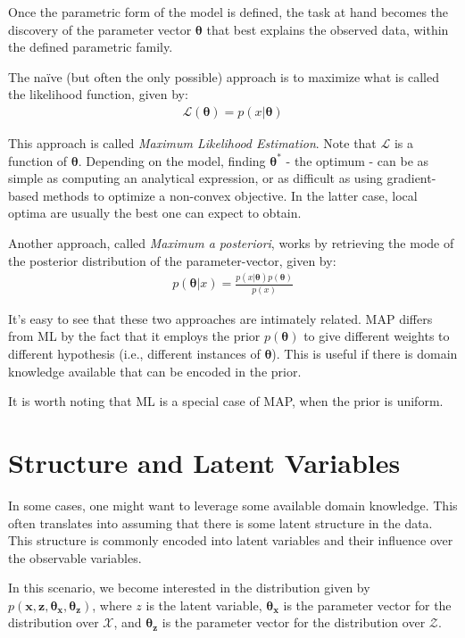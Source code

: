 Once the parametric form of the model is defined, the task at hand becomes the
discovery of the parameter vector $\bm{\theta}$ that best explains the observed
data, within the defined parametric family.

The naïve (but often the only possible) approach is to maximize what is called
the likelihood function, given by:
\begin{align}
    \mathcal{L}(\bm{\theta}) = p(x | \bm{\theta})
\end{align}

This approach is called \emph{Maximum Likelihood Estimation}. Note that $\mathcal{L}$
is a function of $\bm{\theta}$. Depending on the model, finding $\bm{\theta}^*$ - the optimum -
can be as simple as computing an analytical expression, or as difficult as using
gradient-based methods to optimize a non-convex objective. In the latter case,
local optima are usually the best one can expect to obtain.

Another approach, called \emph{Maximum a posteriori}, works by retrieving the
mode of the posterior distribution of the parameter-vector, given by:
\begin{align}
    p(\bm{\theta} | x) = \frac{p(x |\bm{\theta})p(\bm{\theta})}{p(x)}
\end{align}

It's easy to see that these two approaches are intimately related. MAP differs
from ML by the fact that it employs the prior $p(\bm{\theta})$ to give different
weights to different hypothesis (i.e., different instances of $\bm{\theta}$). This
is useful if there is domain knowledge available that can be encoded in the
prior.

It is worth noting that ML is a special case of MAP, when the prior is uniform.

\section{Structure and Latent Variables}
\label{section:probmodellatvar}
In some cases, one might want to leverage some available domain knowledge. This
often translates into assuming that there is some latent structure in the data.
This structure is commonly encoded into latent variables and their influence over
the observable variables.

In this scenario, we become interested in the distribution given by
$p(\bm{x}, \bm{z}, \bm{\theta_x}, \bm{\theta_z})$, where $z$ is the latent variable, $\bm{\theta_x}$ is
the parameter vector for the distribution over $\bm{\mathcal{X}}$, and $\bm{\theta_z}$ is
the parameter vector for the distribution over $\bm{\mathcal{Z}}$.

